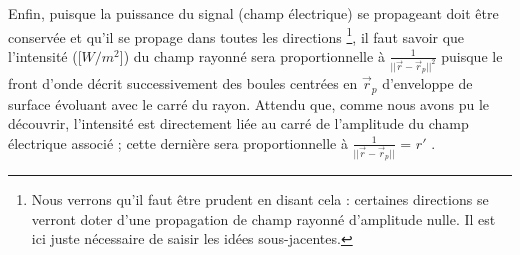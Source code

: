 Enfin, puisque la puissance du signal (champ électrique) se propageant doit être conservée et qu'il se propage dans toutes les directions \footnote{Nous verrons qu'il faut être prudent en disant cela : certaines directions se verront doter d'une propagation de champ rayonné d'amplitude nulle. Il est ici juste nécessaire de saisir les idées sous-jacentes.}, il faut savoir que l'intensité ([$W/m^{2}$]) du champ rayonné sera proportionnelle à $\frac{1}{|| \vec{r} - \vec{r}_{p} ||^{2} }$ puisque le front d'onde décrit successivement des boules centrées en $\vec{r}_{p}$ d'enveloppe de surface évoluant avec le carré du rayon. Attendu que, comme nous avons pu le découvrir, l'intensité est directement liée au carré de l'amplitude du champ électrique associé ; cette dernière sera proportionnelle à $\frac{1}{||\vec{r} - \vec{r}_{p}||}$ = $r'$ .
